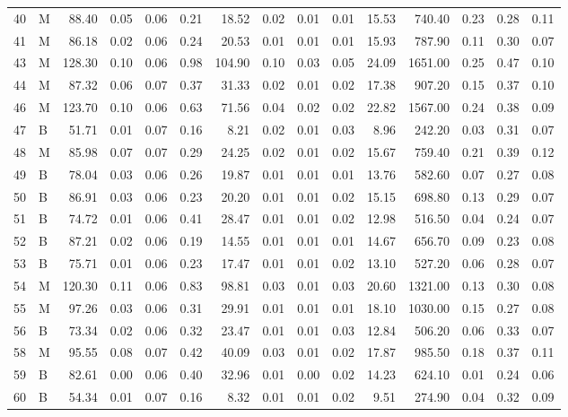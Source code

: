 \begin{table}[ht]
\begin{tabular}{rlrrrrrrrrrrrrr}
  40 & M & 88.40 & 0.05 & 0.06 & 0.21 & 18.52 & 0.02 & 0.01 & 0.01 & 15.53 & 740.40 & 0.23 & 0.28 & 0.11 \\ 
  41 & M & 86.18 & 0.02 & 0.06 & 0.24 & 20.53 & 0.01 & 0.01 & 0.01 & 15.93 & 787.90 & 0.11 & 0.30 & 0.07 \\ 
  43 & M & 128.30 & 0.10 & 0.06 & 0.98 & 104.90 & 0.10 & 0.03 & 0.05 & 24.09 & 1651.00 & 0.25 & 0.47 & 0.10 \\ 
  44 & M & 87.32 & 0.06 & 0.07 & 0.37 & 31.33 & 0.02 & 0.01 & 0.02 & 17.38 & 907.20 & 0.15 & 0.37 & 0.10 \\ 
  46 & M & 123.70 & 0.10 & 0.06 & 0.63 & 71.56 & 0.04 & 0.02 & 0.02 & 22.82 & 1567.00 & 0.24 & 0.38 & 0.09 \\ 
  47 & B & 51.71 & 0.01 & 0.07 & 0.16 & 8.21 & 0.02 & 0.01 & 0.03 & 8.96 & 242.20 & 0.03 & 0.31 & 0.07 \\ 
  48 & M & 85.98 & 0.07 & 0.07 & 0.29 & 24.25 & 0.02 & 0.01 & 0.02 & 15.67 & 759.40 & 0.21 & 0.39 & 0.12 \\ 
  49 & B & 78.04 & 0.03 & 0.06 & 0.26 & 19.87 & 0.01 & 0.01 & 0.01 & 13.76 & 582.60 & 0.07 & 0.27 & 0.08 \\ 
  50 & B & 86.91 & 0.03 & 0.06 & 0.23 & 20.20 & 0.01 & 0.01 & 0.02 & 15.15 & 698.80 & 0.13 & 0.29 & 0.07 \\ 
  51 & B & 74.72 & 0.01 & 0.06 & 0.41 & 28.47 & 0.01 & 0.01 & 0.02 & 12.98 & 516.50 & 0.04 & 0.24 & 0.07 \\ 
  52 & B & 87.21 & 0.02 & 0.06 & 0.19 & 14.55 & 0.01 & 0.01 & 0.01 & 14.67 & 656.70 & 0.09 & 0.23 & 0.08 \\ 
  53 & B & 75.71 & 0.01 & 0.06 & 0.23 & 17.47 & 0.01 & 0.01 & 0.02 & 13.10 & 527.20 & 0.06 & 0.28 & 0.07 \\ 
  54 & M & 120.30 & 0.11 & 0.06 & 0.83 & 98.81 & 0.03 & 0.01 & 0.03 & 20.60 & 1321.00 & 0.13 & 0.30 & 0.08 \\ 
  55 & M & 97.26 & 0.03 & 0.06 & 0.31 & 29.91 & 0.01 & 0.01 & 0.01 & 18.10 & 1030.00 & 0.15 & 0.27 & 0.08 \\ 
  56 & B & 73.34 & 0.02 & 0.06 & 0.32 & 23.47 & 0.01 & 0.01 & 0.03 & 12.84 & 506.20 & 0.06 & 0.33 & 0.07 \\ 
  58 & M & 95.55 & 0.08 & 0.07 & 0.42 & 40.09 & 0.03 & 0.01 & 0.02 & 17.87 & 985.50 & 0.18 & 0.37 & 0.11 \\ 
  59 & B & 82.61 & 0.00 & 0.06 & 0.40 & 32.96 & 0.01 & 0.00 & 0.02 & 14.23 & 624.10 & 0.01 & 0.24 & 0.06 \\ 
  60 & B & 54.34 & 0.01 & 0.07 & 0.16 & 8.32 & 0.01 & 0.01 & 0.02 & 9.51 & 274.90 & 0.04 & 0.32 & 0.09 \\ 

\end{tabular}
\end{table}
